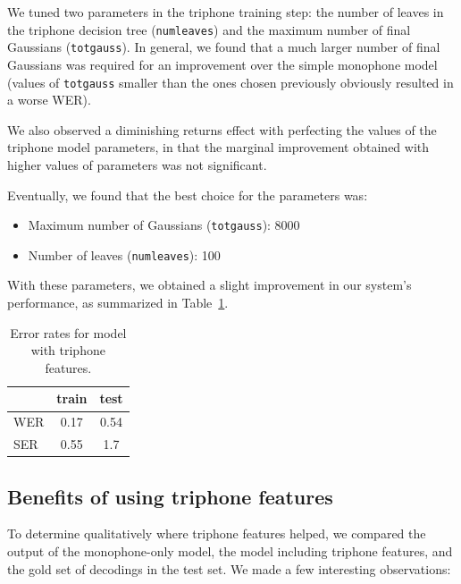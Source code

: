 \documentclass[twocolumn, 11pt]{article}
\begin{document}
We tuned two parameters in the triphone training step: the number of leaves in
the triphone decision tree (\texttt{numleaves}) and the maximum number of final
Gaussians (\texttt{totgauss}). In general, we found that a much larger number of
final Gaussians was required for an improvement over the simple monophone model
(values of \texttt{totgauss} smaller than the ones chosen previously obviously
resulted in a worse WER).

We also observed a diminishing returns effect with perfecting the values of the
triphone model parameters, in that the marginal improvement obtained with higher
values of parameters was not significant.

Eventually, we found that the best choice for the parameters was:
\begin{itemize}
  \item Maximum number of Gaussians (\texttt{totgauss}): 8000
  \item Number of leaves (\texttt{numleaves}): 100
\end{itemize}

With these parameters, we obtained a slight improvement in our system's
performance, as summarized in Table~\ref{tab:wer-triphone}.

\begin{table}[h]\centering
  \begin{tabular}{lcc}
    \toprule
    & train & test \\
    \midrule
    WER & 0.17 & 0.54 \\
    SER & 0.55 & 1.7 \\
    \bottomrule
  \end{tabular}
  \caption{Error rates for model with triphone features.}\label{tab:wer-triphone}
\end{table}

\subsection{Benefits of using triphone features}
To determine qualitatively where triphone features helped, we compared the output
of the monophone-only model, the model including triphone features, and the gold
set of decodings in the test set. We made a few interesting observations:
\end{document}
